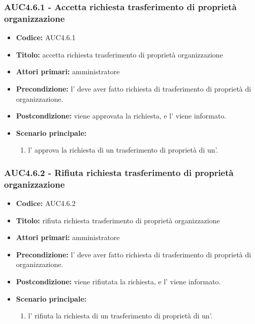 \documentclass[casi-duso]{subfiles}
\begin{document}
\subsubsection{AUC4.6.1 - Accetta richiesta trasferimento di proprietà organizzazione}
\label{subsub:AUC4.6.1}
\begin{itemize}
  \item \textbf{Codice:} AUC4.6.1
  \item \textbf{Titolo:} accetta richiesta trasferimento di proprietà organizzazione
  \item \textbf{Attori primari:} amministratore
  \item \textbf{Precondizione:} l' deve aver fatto richiesta di trasferimento di proprietà di organizzazione.
  \item \textbf{Postcondizione:} viene approvata la richiesta, e l' viene informato.
  \item \textbf{Scenario principale:} 
  \begin{enumerate}
    \item l' approva la richiesta di un trasferimento di proprietà di un'.
  \end{enumerate}
\end{itemize}  

\subsubsection{AUC4.6.2 - Rifiuta richiesta trasferimento di proprietà organizzazione}
\label{subsub:AUC4.6.2}
\begin{itemize}
  \item \textbf{Codice:} AUC4.6.2
  \item \textbf{Titolo:} rifiuta richiesta trasferimento di proprietà organizzazione
  \item \textbf{Attori primari:} amministratore
  \item \textbf{Precondizione:} l' deve aver fatto richiesta di trasferimento di proprietà di organizzazione.
  \item \textbf{Postcondizione:} viene rifiutata la richiesta, e l' viene informato.
  \item \textbf{Scenario principale:} 
  \begin{enumerate}
    \item  l' rifiuta la richiesta di un trasferimento di proprietà di un'.
  \end{enumerate}
\end{itemize}
\end{document}
